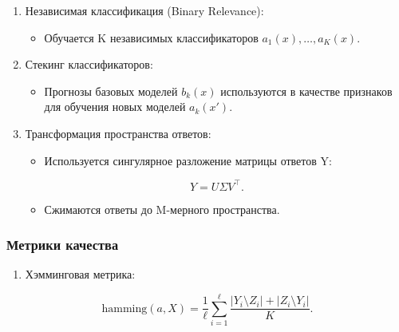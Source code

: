 \begin{enumerate}
\def\labelenumi{\arabic{enumi}.}
\tightlist
\item
  Независимая классификация (Binary Relevance):

  \begin{itemize}
  \tightlist
  \item
    Обучается K независимых классификаторов
    \(a_1(x), \ldots, a_K(x)\).
  \end{itemize}
\item
  Стекинг классификаторов:

  \begin{itemize}
  \tightlist
  \item
    Прогнозы базовых моделей \(b_k(x)\) используются в качестве
    признаков для обучения новых моделей \(a_k(x')\).
  \end{itemize}

  
\item
  Трансформация пространства ответов:

  \begin{itemize}
  \item
    Используется сингулярное разложение матрицы ответов Y:
  \end{itemize}

  \begin{equation}
  Y = U \Sigma V^\top.
  \end{equation}

  \begin{itemize}
  \item
    Сжимаются ответы до M-мерного пространства.
  \end{itemize}
\end{enumerate}

\hypertarget{ux43cux435ux442ux440ux438ux43aux438-ux43aux430ux447ux435ux441ux442ux432ux430}{%
\subsubsection*{Метрики
качества}\label{ux43cux435ux442ux440ux438ux43aux438-ux43aux430ux447ux435ux441ux442ux432ux430}}

\begin{enumerate}
\def\labelenumi{\arabic{enumi}.}
\tightlist
\item
  Хэмминговая метрика:
\end{enumerate}

\begin{equation}
\text{hamming}(a, X) = \frac{1}{\ell} \sum_{i=1}^\ell \frac{|Y_i \setminus Z_i| + |Z_i \setminus Y_i|}{K}.
\end{equation}

